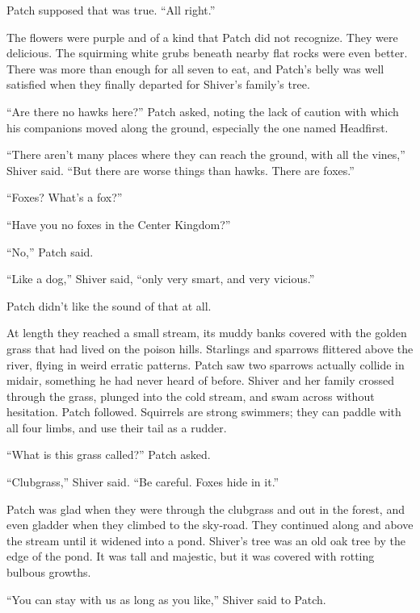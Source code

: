 \documentclass[ebook,oneside,openany,17pt]{memoir}
\newenvironment{tolerant}[1]{%
  \par\tolerance=#1\relax
}{%
  \par
}
\begin{document}
Patch supposed that was true. “All right.”

The flowers were purple and of a kind that Patch did not
recognize. They were delicious. The squirming white grubs beneath
nearby flat rocks were even better. There was more than enough for all
seven to eat, and Patch’s belly was well satisfied when they finally
departed for Shiver’s family’s tree.

\begin{tolerant}{500}
“Are there no hawks here?” Patch asked, noting the lack of caution
with which his companions moved along the ground, especially the one
named Headfirst.
\end{tolerant}

\begin{tolerant}{500}
“There aren’t many places where they can reach the ground, with all
the vines,” Shiver said. “But there are worse things than hawks. There
are foxes.”
\end{tolerant}

“Foxes? What’s a fox?”

“Have you no foxes in the Center Kingdom?”

“No,” Patch said.

“Like a dog,” Shiver said, “only very smart, and very vicious.”

Patch didn’t like the sound of that at all.

At length they reached a small stream, its muddy banks covered with
the golden grass that had lived on the poison hills. Starlings and
sparrows flittered above the river, flying in weird erratic
patterns. Patch saw two sparrows actually collide in midair, something
he had never heard of before. Shiver and her family crossed through
the grass, plunged into the cold stream, and swam across without
hesitation. Patch followed. Squirrels are strong swimmers; they can
paddle with all four limbs, and use their tail as a rudder.

“What is this grass called?” Patch asked.

“Clubgrass,” Shiver said. “Be careful. Foxes hide in it.”

Patch was glad when they were through the clubgrass and out in the
forest, and even gladder when they climbed to the sky-road. They
continued along and above the stream until it widened into a
pond. Shiver’s tree was an old oak tree by the edge of the pond. It
was tall and majestic, but it was covered with rotting bulbous
growths.

“You can stay with us as long as you like,” Shiver said to Patch.
\end{document}

